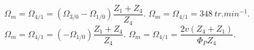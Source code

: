 \begin{corrigebox}[Corrigé]
$\Omega_m = \Omega_{4/1}=\left(\Omega_{3/0}-\Omega_{1/0} \right) \dfrac{Z_1 + Z_4 }{Z_4}$.
$\Omega_{m}=\Omega_{4/1}=\SI{348}{tr.min^{-1}}$.
$\Omega_m = \Omega_{4/1}=\left(-\Omega_{1/0} \right) \dfrac{Z_1 + Z_4 }{Z_4}$.
$\Omega_m = \Omega_{4/1}=\dfrac{2v \left(Z_4 + Z_1\right)}{\Phi_P Z_4}$.
%
%
%
\end{corrigebox}
